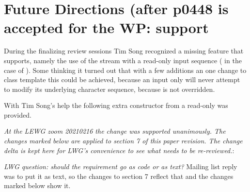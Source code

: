 \documentclass[ebook,11pt,article]{memoir}
\begin{document}
\section{Future Directions (after p0448 is accepted for the WP: support }

During the finalizing review sessions Tim Song recognized a missing feature that  supports, namely the use of the stream with a read-only input sequence ( in the case of ). Some thinking it turned out that with a few additions an one change to class template  this could be achieved, because an input only  will never attempt to modify its underlying character sequence, because  is not overridden.

With Tim Song's help the following extra constructor from a read-only  was provided.


\emph{At the LEWG zoom 20210216 the change was supported unanimously. The changes marked below are applied to section 7 of this paper revision. The change delta is kept here for LWG's convenience to see what needs to be re-reviewed.}:

\emph{LWG question: should the requirement go as code or as text?} Mailing list reply was to put it as text, so the changes to section 7 reflect that and the changes marked below show it.
\end{document}

